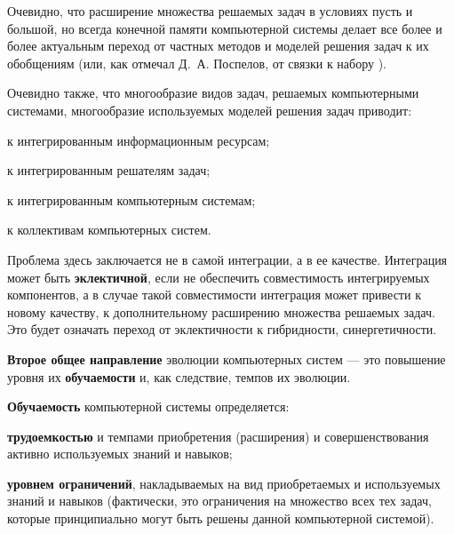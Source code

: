 Очевидно, что расширение множества решаемых задач в условиях пусть и большой, но всегда конечной памяти компьютерной системы делает все более и более актуальным переход от частных методов и моделей решения задач к их обобщениям (или, как отмечал Д.~А. Поспелов, от связки  к набору ).

Очевидно также, что многообразие видов задач, решаемых компьютерными системами, многообразие используемых моделей решения задач приводит: 
\begin{textitemize}
    \item к интегрированным информационным ресурсам;
    \item к интегрированным решателям задач;
    \item к интегрированным компьютерным системам;
    \item к коллективам компьютерных систем.
\end{textitemize}

Проблема здесь заключается не в самой интеграции, а в ее качестве. Интеграция может быть \textbf{эклектичной}, если не обеспечить совместимость интегрируемых компонентов, а в случае такой совместимости интеграция может привести к новому качеству, к дополнительному расширению множества решаемых задач. Это будет означать переход от эклектичности к гибридности, синергетичности.

\textbf{Второе общее направление} эволюции компьютерных систем --- это повышение уровня их \textbf{обучаемости} и, как следствие, темпов их эволюции.

\textbf{Обучаемость} компьютерной системы определяется:
\begin{textitemize}
    \item \textbf{трудоемкостью} и темпами приобретения (расширения) и совершенствования активно используемых знаний и навыков;
    \item \textbf{уровнем ограничений}, накладываемых на вид приобретаемых и используемых знаний и навыков (фактически, это ограничения на множество всех тех задач, которые принципиально могут быть решены данной компьютерной системой).
\end{textitemize}

